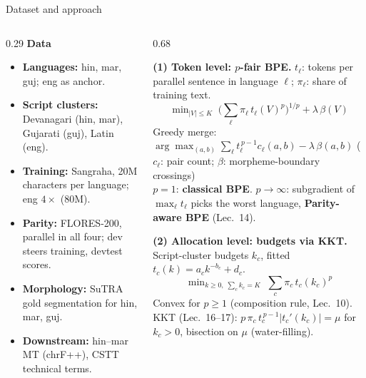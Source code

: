 \documentclass[aspectratio=169,10pt]{beamer}
\begin{document}
\begin{frame}{Dataset and approach}
\begin{columns}[T,onlytextwidth]
\begin{column}{0.29\textwidth}
\footnotesize
\textbf{\color{iitbblue}\small Data}
\begin{itemize}\setlength{\itemsep}{3pt}
  \item \textbf{Languages:} hin, mar, guj; eng as anchor.
  \item \textbf{Script clusters:} Devanagari (hin, mar), Gujarati (guj), Latin (eng).
  \item \textbf{Training:} Sangraha, 20M characters per language; eng $4\times$ (80M).
  \item \textbf{Parity:} FLORES-200, parallel in all four; dev steers training, devtest scores.
  \item \textbf{Morphology:} SuTRA gold segmentation for hin, mar, guj.
  \item \textbf{Downstream:} hin--mar MT (chrF++), CSTT technical terms.
\end{itemize}
\end{column}
\begin{column}{0.68\textwidth}
\begin{keybox}
\textbf{\color{iitbblue}(1) Token level: $p$-fair BPE.} $t_\ell$: tokens per parallel sentence in language $\ell$; $\pi_\ell$: share of training text.
\vskip-6pt
\[
\min\nolimits_{|V|\le K}\;\Big(\textstyle\sum_\ell \pi_\ell\, t_\ell(V)^{p}\Big)^{1/p}+\lambda\,\beta(V)
\]
\vskip-4pt
Greedy merge: $\arg\max_{(a,b)}\sum_\ell t_\ell^{\,p-1}c_\ell(a,b)-\lambda\,\beta(a,b)$
{\color{muted}\footnotesize($c_\ell$: pair count; $\beta$: morpheme-boundary crossings)}\\[3pt]
$p=1$: \textbf{classical BPE}. \; $p\to\infty$: subgradient of $\max_\ell t_\ell$ picks the worst language, \textbf{Parity-aware BPE} (Lec.~14).
\end{keybox}
\vskip-2pt
\begin{keybox}
\textbf{\color{iitbblue}(2) Allocation level: budgets via KKT.} Script-cluster budgets $k_c$, fitted $t_c(k)=a_c k^{-b_c}+d_c$.
\vskip-6pt
\[
\min\nolimits_{k\ge 0,\;\sum_c k_c=K}\;\textstyle\sum_c \pi_c\, t_c(k_c)^{p}
\]
\vskip-4pt
Convex for $p\ge1$ (composition rule, Lec.~10). KKT (Lec.~16--17): $p\,\pi_c\,t_c^{\,p-1}|t_c'(k_c)|=\mu$ for $k_c>0$, bisection on $\mu$ (water-filling).
\end{keybox}
\end{column}
\end{columns}
\end{frame}
\end{document}
